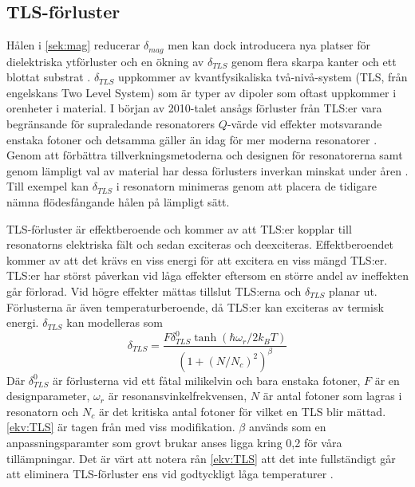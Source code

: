 \documentclass[main.tex]{subfiles}
\begin{document}

\subsection{TLS-förluster}
\label{sec:tls}
Hålen i \ref{sek:mag} reducerar $\delta_{mag}$ men kan dock introducera nya platser för dielektriska ytförluster och en ökning av $\delta_{TLS}$ genom flera skarpa kanter och ett blottat substrat \cite{Chiaro2016}. $\delta_{TLS}$ uppkommer av kvantfysikaliska två-nivå-system (TLS, från engelskans Two Level System) som är typer av dipoler som oftast uppkommer i orenheter i material. I början av 2010-talet ansågs förluster från TLS:er vara begränsande för supraledande resonatorers $Q$-värde vid effekter motsvarande enstaka fotoner \cite{Siddiqi2011} och detsamma gäller än idag för mer moderna resonatorer \cite{Boehme2016}\cite{Goetz2016}. Genom att förbättra tillverkningsmetoderna och designen för resonatorerna samt genom lämpligt val av material har dessa förlusters inverkan minskat under åren \cite{Oliver2013}. Till exempel kan $\delta_{TLS}$ i resonatorn minimeras genom att placera de tidigare nämna flödesfångande hålen på lämpligt sätt\cite{Chiaro2016}.

TLS-förluster är effektberoende och kommer av att TLS:er kopplar till resonatorns elektriska fält och sedan exciteras och deexciteras\cite{Boehme2016,Goetz2016}. 
Effektberoendet kommer av att det krävs en viss energi för att excitera en viss mängd TLS:er. TLS:er har störst påverkan vid låga effekter eftersom en större andel av ineffekten går förlorad. Vid högre effekter mättas tillslut TLS:erna och $\delta_{TLS}$ planar ut. Förlusterna är även temperaturberoende, då TLS:er kan exciteras av termisk energi.
$\delta_{TLS}$ kan modelleras som
\begin{equation}
    \delta_{TLS}=\frac{F\delta_{TLS}^0\tanh{(\hbar\omega_r/2k_BT)}}{(1+(N/N_c)^2)^\beta}
    \label{ekv:TLS}
\end{equation}
Där $\delta_{TLS}^0$ är förlusterna vid ett fåtal milikelvin och bara enstaka fotoner, $F$ är en designparameter, $\omega_r$ är resonansvinkelfrekvensen, $N$ är antal fotoner som lagras i resonatorn och $N_c$ är det kritiska antal fotoner för vilket en TLS blir mättad. \eqref{ekv:TLS} är tagen från \cite{pappas2011two} med viss modifikation. $\beta$ används som en anpassningsparamter som grovt brukar anses ligga kring 0,2 \cite{faoro2012} för våra tillämpningar. Det är värt att notera rån \eqref{ekv:TLS} att det inte fullständigt går att eliminera TLS-förluster ens vid godtyckligt låga temperaturer \cite{Boehme2016}.
\end{document}

